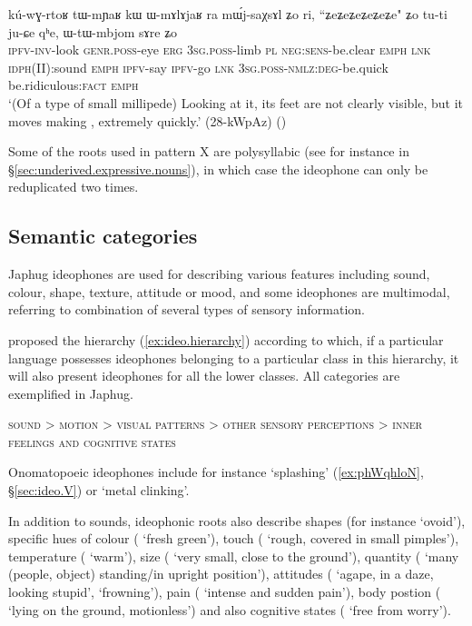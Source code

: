 \begin{exe}
\ex \label{ex:ZeZeZeZe}
\gll kú-wɣ-rtoʁ tɯ-mɲaʁ kɯ ɯ-mɤlɤjaʁ ra mɯ́j-saχsɤl ʑo ri, ``ʑeʑeʑeʑeʑeʑe" ʑo tu-ti ju-ɕe qʰe, ɯ-tɯ-mbjom sɤre ʑo \\
\textsc{ipfv}-\textsc{inv}-look \textsc{genr}.\textsc{poss}-eye \textsc{erg} \textsc{3sg}.\textsc{poss}-limb \textsc{pl} \textsc{neg}:\textsc{sens}-be.clear \textsc{emph} \textsc{lnk} \textsc{idph}(II):sound \textsc{emph} \textsc{ipfv}-say \textsc{ipfv}-go \textsc{lnk} \textsc{3sg}.\textsc{poss}-\textsc{nmlz}:\textsc{deg}-be.quick be.ridiculous:\textsc{fact} \textsc{emph} \\
\glt `(Of a type of small millipede) Looking at it, its feet are not clearly visible, but it moves making , extremely quickly.' (28-kWpAz)
()
\end{exe} 

Some of the roots used in pattern X are polysyllabic (see for instance  in §\ref{sec:underived.expressive.nouns}), in which case the ideophone can only be reduplicated two times.

  
\subsection{Semantic categories}
Japhug ideophones are used for describing various features including sound, colour, shape, texture, attitude or mood, and some ideophones are multimodal, referring to combination of several types of sensory information.

\citet[663]{dingemanse12ideo} proposed the hierarchy (\ref{ex:ideo.hierarchy}) according to which, if a particular language possesses ideophones belonging to a particular class in this hierarchy, it will also present ideophones for all the lower classes. All categories are exemplified in Japhug.

\begin{exe} 
\ex  \label{ex:ideo.hierarchy}
\glt \textsc{sound} > \textsc{motion} > \textsc{visual patterns}  > \textsc{other sensory perceptions} > \textsc{inner feelings and cognitive states}
\end{exe}

Onomatopoeic ideophones include for instance  `splashing' (\ref{ex:phWqhloN}, §\ref{sec:ideo.V}) or  `metal clinking'. 

In addition to sounds, ideophonic roots also describe shapes (for instance  `ovoid'), specific hues of colour ( `fresh green'), touch ( `rough, covered in small pimples'), temperature ( `warm'), size ( `very small, close to the ground'), quantity ( `many (people, object) standing/in upright position'), attitudes ( `agape, in a daze, looking stupid',  `frowning'), pain ( `intense and sudden pain'), body postion ( `lying on the ground, motionless') and also cognitive states ( `free from worry').


